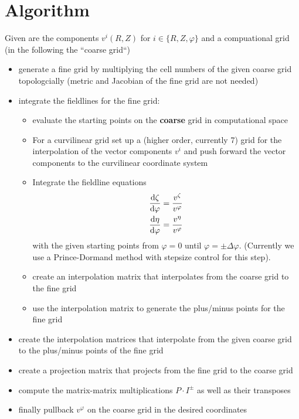 \section{Algorithm}
Given are the components $v^i(R,Z)$ for $i\in\{R,Z,\varphi\}$ and a compuational grid (in the following the ``coarse grid``)
\begin{itemize}
  \item generate a fine grid by multiplying the cell numbers of the given coarse grid topologcially (metric and Jacobian of the fine grid are not needed)
  \item integrate the fieldlines for the fine grid:
    \begin{itemize}
      \item evaluate the starting points on the \textbf{coarse} grid in computational space
      \item For a curvilinear grid set up a (higher order, currently 7) grid for the
        interpolation of the vector components $v^i$ and push forward the vector components
        to the curvilinear coordinate system
      \item Integrate the fieldline equations
\begin{subequations}
\begin{align}
\frac{\mathrm{d} \zeta}{\mathrm{d}\varphi} &= \frac{v^\zeta}{v^\varphi}\\
\frac{\mathrm{d} \eta}{\mathrm{d}\varphi} &= \frac{v^\eta}{v^\varphi}
\end{align}
\label{eq:fieldlines_converted}
\end{subequations}
    with the given starting points from $\varphi=0$ until $\varphi = \pm\Delta \varphi$. (Currently we use a Prince-Dormand method with stepsize control for this step).
      \item create an interpolation matrix that interpolates from the coarse grid
        to the fine grid
      \item use the interpolation matrix to generate the plus/minus points for the fine grid
    \end{itemize}
  \item create the interpolation matrices that interpolate from the given coarse grid
    to the plus/minus points of the fine grid
  \item create a projection matrix that projects from the fine grid to the coarse grid
  \item compute the matrix-matrix multiplications $P\cdot I^\pm$ as well as their transposes
  \item finally pullback $v^\varphi$ on the coarse grid in the desired coordinates
\end{itemize}

